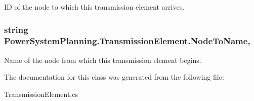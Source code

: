 ID of the node to which this transmission element arrives. 

\subsubsection[{\texorpdfstring{Node\+To\+Name}{NodeToName}}]{\setlength{\rightskip}{0pt plus 5cm}string Power\+System\+Planning.\+Transmission\+Element.\+Node\+To\+Name\hspace{0.3cm}{\ttfamily [get]}, {\ttfamily [set]}}\hypertarget{class_power_system_planning_1_1_transmission_element_ad6028ae3c8e7ac1527cfde854c81dedd}{}\label{class_power_system_planning_1_1_transmission_element_ad6028ae3c8e7ac1527cfde854c81dedd}


Name of the node from which this transmission element begins. 



The documentation for this class was generated from the following file\+:\begin{DoxyCompactItemize}
\item 
Transmission\+Element.\+cs\end{DoxyCompactItemize}
